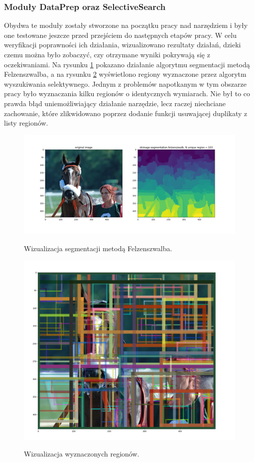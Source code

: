 \documentclass[a4paper,twoside,12pt]{book}
\begin{document}
{\subsubsection{Moduły DataPrep oraz SelectiveSearch}
{Obydwa te moduły zostały stworzone na początku pracy nad narzędziem i były one testowane jeszcze przed przejściem do następnych etapów pracy. W celu weryfikacji poprawności ich działania, wizualizowano rezultaty działań, dzieki czemu można było zobaczyć, czy otrzymane wyniki pokrywają się z oczekiwaniami. Na rysunku \ref{wiz} pokazano działanie algorytmu segmentacji metodą Felzenszwalba, a na rysunku \ref{regions} wyświetlono regiony wyznaczone przez algorytm wyszukiwania selektywnego. Jednym z problemów napotkanym w tym obszarze pracy było wyznaczania kilku regionów o identycznych wymiarach. Nie był to co prawda błąd uniemożliwiający działanie narzędzie, lecz raczej niechciane zachowanie, które zlikwidowano poprzez dodanie funkcji usuwającej duplikaty z listy regionów.
}
\begin{figure}[h!]
\caption{Wizualizacja segmentacji metodą Felzenszwalba.}

\centering
\includegraphics[scale=0.3]{example.png}
\label{wiz}
\end{figure}



\begin{figure}[h!]
\caption{Wizualizacja wyznaczonych regionów.}

\centering
\includegraphics[scale=0.2]{example2.png}
\label{regions}
\end{figure}

}
\end{document}
